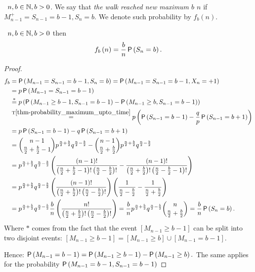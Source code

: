 \begin{defn}\label{defn-new_maximum}
 \Lrw\ $n,b\in \mathbb{N},b>0$. We say that \emph{the walk reached new maximum $b$ \intime $n$} if $M_{n-1}^+=S_{n-1}=b-1, S_n=b$. We denote such probability by $f_b \left( n \right).$
\end{defn}
\begin{thm}\label{thm-probability_new_maximum}
 \Lrw\ $n,b \in \mathbb{N}, b>0$ then
 \[
  f_b \left( n \right) =\frac{b}{n}\operatorname{\mathsf{P}} \left( S_n=b \right).
 \]
\end{thm}
\begin{proof}
  \[
  \begin{split}
    f_b & = \operatorname{\mathsf{P}} \left( M_{n-1}=S_{n-1}=b-1, S_n=b \right)
    =\operatorname{\mathsf{P}} \left(M_{n-1}=S_{n-1}=b-1, X_n=+1\right)\\
    & =p\operatorname{\mathsf{P}} \left( M_{n-1}=S_{n-1}=b-1 \right)\\
    & \overset{*}{=}p \left( \operatorname{\mathsf{P}} \left( M_{n-1}\geq b-1, S_{n-1}=b-1 \right) -\operatorname{\mathsf{P}} \left( M_{n-1}\geq b, S_{n-1}=b-1 \right) \right) \\
    & \overset{\text{T}\ref{thm-probability_maximum_upto_time}}{=}p \left( \operatorname{\mathsf{P}} \left( S_{n-1}=b-1 \right) -\frac{q}{p}\operatorname{\mathsf{P}} \left( S_{n-1}=b+1 \right) \right) \\
    & =p\operatorname{\mathsf{P}} \left( S_{n-1}=b-1 \right) -q \operatorname{\mathsf{P}} \left( S_{n-1}=b+1 \right) \\
    & =\binom{n-1}{\frac{n}{2}+\frac{b}{2}-1}p^{\frac{n}{2}+\frac{b}{2}}q^{\frac{n}{2}-\frac{b}{2}}-\binom{n-1}{\frac{n}{2}+\frac{b}{2}}
    p^{\frac{n}{2}+\frac{b}{2}}q^{\frac{n}{2}-\frac{b}{2}}\\
    & =p^{\frac{n}{2}+\frac{b}{2}}q^{\frac{n}{2}-\frac{b}{2}} \left( \frac{ \left( n-1 \right) !}{ \left( \frac{n}{2}+\frac{b}{2}-1 \right) ! \left( \frac{n}{2}-\frac{b}{2} \right) !}-\frac{ \left( n-1 \right) !}{ \left( \frac{n}{2}+\frac{b}{2} \right) ! \left( \frac{n}{2}-\frac{b}{2}-1 \right) !} \right)\\
    & =p^{\frac{n}{2}+\frac{b}{2}}q^{\frac{n}{2}-\frac{b}{2}} \left( \frac{ \left( n-1 \right) !}{ \left( \frac{n}{2}+\frac{b}{2} \right) ! \left( \frac{n}{2}-\frac{b}{2} \right) !} \right) \left( \frac{1}{\frac{n}{2}-\frac{b}{2}}-\frac{1}{\frac{n}{2}+\frac{b}{2}} \right) \\
    & =p^{\frac{n}{2}+\frac{b}{2}}q^{\frac{n}{2}-\frac{b}{2}}\frac{b}{n} \left( \frac{n!}{ \left( \frac{n}{2}+\frac{b}{2} \right) ! \left( \frac{n}{2}-\frac{b}{2} \right) !} \right)
    =\frac{b}{n}p^{\frac{n}{2}+\frac{b}{2}}q^{\frac{n}{2}-\frac{b}{2}}\binom{n}{\frac{n}{2}+\frac{b}{2}}
    =\frac{b}{n}\operatorname{\mathsf{P}} \left( S_n=b \right).
     \end{split}
  \]
 Where $*$ comes from the fact that the event $[M_{n-1}\geq b-1]$ can be split into two disjoint events:
 $[M_{n-1}\geq b-1]=[M_{n-1}\geq b]\cup [M_{n-1}=b-1].$

 Hence: $\operatorname{\mathsf{P}}\left(M_{n-1}=b-1\right)=\operatorname{\mathsf{P}}\left(M_{n-1}\geq b-1\right)-\operatorname{\mathsf{P}}\left(M_{n-1}\geq b\right).$ The same applies for the probability $\operatorname{\mathsf{P}}\left(M_{n-1}=b-1, S_{n-1}=b-1\right)
 $
\end{proof}

